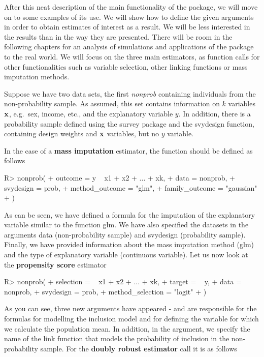 \documentclass[
]{jss}
\begin{document}
After this neat description of the main functionality of the package, we
will move on to some examples of its use. We will show how to define the
given arguments in order to obtain estimates of interest as a result. We
will be less interested in the results than in the way they are
presented. There will be room in the following chapters for an analysis
of simulations and applications of the package to the real world. We
will focus on the three main estimators, as function calls for other
functionalities such as variable selection, other linking functions or
mass imputation methods.

Suppose we have two data sets, the first \textit{nonprob} containing
individuals from the non-probability sample. As assumed, this set
contains information on \(k\) variables \(\bold{x}\), e.g.~sex, income,
etc., and the explanatory variable \(y\). In addition, there is a
probability sample defined using the survey package and the svydesign
function, containing design weights and \(\bold{x}\) variables, but no
\(y\) variable.

In the case of a \textbf{mass imputation} estimator, the function should
be defined as follows

\begin{CodeChunk}
\begin{CodeInput}
R> nonprob(
+   outcome = y ~ x1 + x2 + ... + xk, 
+   data = nonprob, 
+   svydesign = prob, 
+   method_outcome = "glm", 
+   family_outcome = "gaussian"
+ )
\end{CodeInput}
\end{CodeChunk}

As can be seen, we have defined a formula for the imputation of the
explanatory variable similar to the function glm. We have also specified
the datasets in the arguments data (non-probability sample) and
svydesign (probability sample). Finally, we have provided information
about the mass imputation method (glm) and the type of explanatory
variable (continuous variable). Let us now look at the
\textbf{propensity score} estimator

\begin{CodeChunk}
\begin{CodeInput}
R> nonprob(
+   selection =  ~ x1 + x2 + ... + xk, 
+   target = ~ y, 
+   data = nonprob, 
+   svydesign = prob, 
+   method_selection = "logit"
+ )
\end{CodeInput}
\end{CodeChunk}

As you can see, three new arguments have appeared -  and
 are responsible for the formulas for modelling the
inclusion model and for defining the variable for which we calculate the
population mean. In addition, in the  argument,
we specify the name of the link function that models the probability of
inclusion in the non-probability sample. For the
\textbf{doubly robust estimator} call it is as follows
\end{document}
